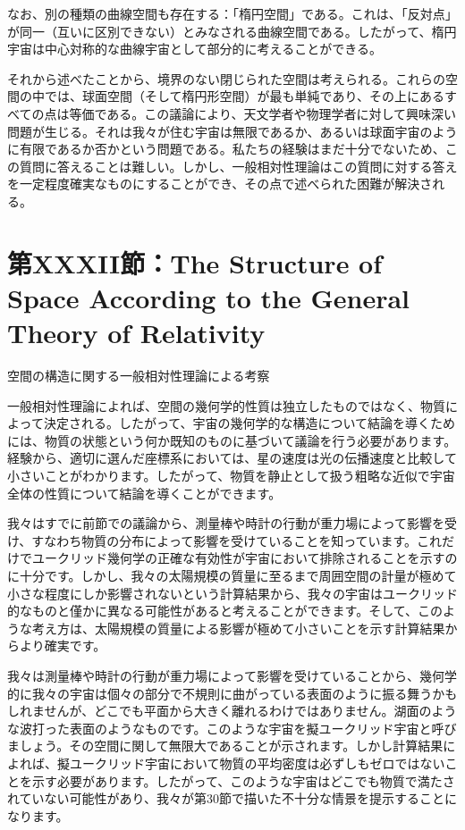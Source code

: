 \documentclass[a4paper,11pt,openany]{ltjsbook}
\begin{document}
なお、別の種類の曲線空間も存在する：「楕円空間」である。これは、「反対点」が同一（互いに区別できない）とみなされる曲線空間である。したがって、楕円宇宙は中心対称的な曲線宇宙として部分的に考えることができる。

それから述べたことから、境界のない閉じられた空間は考えられる。これらの空間の中では、球面空間（そして楕円形空間）が最も単純であり、その上にあるすべての点は等価である。この議論により、天文学者や物理学者に対して興味深い問題が生じる。それは我々が住む宇宙は無限であるか、あるいは球面宇宙のように有限であるか否かという問題である。私たちの経験はまだ十分でないため、この質問に答えることは難しい。しかし、一般相対性理論はこの質問に対する答えを一定程度確実なものにすることができ、その点で述べられた困難が解決される。


\clearpage
\chapter{第XXXII節：The Structure of Space According to the General Theory of Relativity}

空間の構造に関する一般相対性理論による考察

一般相対性理論によれば、空間の幾何学的性質は独立したものではなく、物質によって決定される。したがって、宇宙の幾何学的な構造について結論を導くためには、物質の状態という何か既知のものに基づいて議論を行う必要があります。経験から、適切に選んだ座標系においては、星の速度は光の伝播速度と比較して小さいことがわかります。したがって、物質を静止として扱う粗略な近似で宇宙全体の性質について結論を導くことができます。

我々はすでに前節での議論から、測量棒や時計の行動が重力場によって影響を受け、すなわち物質の分布によって影響を受けていることを知っています。これだけでユークリッド幾何学の正確な有効性が宇宙において排除されることを示すのに十分です。しかし、我々の太陽規模の質量に至るまで周囲空間の計量が極めて小さな程度にしか影響されないという計算結果から、我々の宇宙はユークリッド的なものと僅かに異なる可能性があると考えることができます。そして、このような考え方は、太陽規模の質量による影響が極めて小さいことを示す計算結果からより確実です。

我々は測量棒や時計の行動が重力場によって影響を受けていることから、幾何学的に我々の宇宙は個々の部分で不規則に曲がっている表面のように振る舞うかもしれませんが、どこでも平面から大きく離れるわけではありません。湖面のような波打った表面のようなものです。このような宇宙を擬ユークリッド宇宙と呼びましょう。その空間に関して無限大であることが示されます。しかし計算結果によれば、擬ユークリッド宇宙において物質の平均密度は必ずしもゼロではないことを示す必要があります。したがって、このような宇宙はどこでも物質で満たされていない可能性があり、我々が第30節で描いた不十分な情景を提示することになります。
\end{document}
